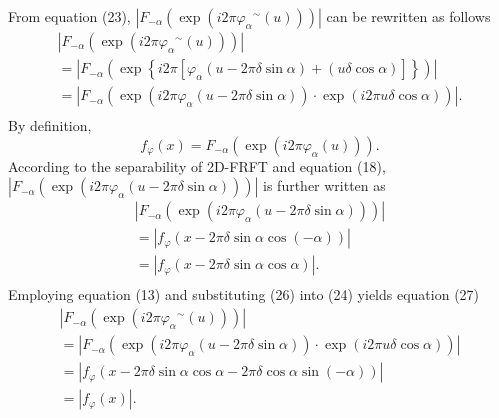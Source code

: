 \documentclass[journal]{IEEEtran}
\begin{document}
From equation (23), $|{{F_{ - \alpha }}(\exp (i2\pi {\varphi _\alpha }^\sim(u)))}|$ can be rewritten as follows
\begin{equation}
\begin{array}{l}
 \left| {{F_{ - \alpha }}(\exp (i2\pi {\varphi _\alpha }^\sim(u)))} \right| \\
  = \left| {{F_{ - \alpha }}(\exp \left\{ {i2\pi [{\varphi _\alpha }(u - 2\pi \delta \sin \alpha ) + (u\delta \cos \alpha )]} \right\})} \right| \\
  = \left| {{F_{ - \alpha }}(\exp (i2\pi {\varphi _\alpha }(u - 2\pi \delta \sin \alpha )) \cdot \exp (i2\pi u\delta \cos \alpha ))} \right|. \\
 \end{array}
\end{equation}
By definition,
\begin{equation}
{f_\varphi }(x) = {F_{ - \alpha }}(\exp (i2\pi {\varphi _\alpha }(u))).
\end{equation}
According to the separability of 2D-FRFT and equation (18), $| {{F_{ - \alpha }}(\exp (i2\pi {\varphi _\alpha }(u - 2\pi \delta \sin \alpha )))} | $ is further written as
\begin{equation}
\begin{array}{l}
 \left| {{F_{ - \alpha }}(\exp (i2\pi {\varphi _\alpha }(u - 2\pi \delta \sin \alpha )))} \right| \\
  = \left| {{f_\varphi }(x - 2\pi \delta \sin \alpha \cos ( - \alpha ))} \right| \\
  = \left| {{f_\varphi }(x - 2\pi \delta \sin \alpha \cos \alpha )} \right|. \\
 \end{array}
\end{equation}
Employing equation (13) and substituting (26) into (24) yields equation (27)
\begin{equation}
\begin{array}{l}
 \left| {{F_{ - \alpha }}(\exp (i2\pi {\varphi _\alpha }^\sim(u)))} \right| \\
  = \left| {{F_{ - \alpha }}(\exp (i2\pi {\varphi _\alpha }(u - 2\pi \delta \sin \alpha )) \cdot \exp (i2\pi u\delta \cos \alpha ))} \right| \\
  = \left| {{f_\varphi }(x - 2\pi \delta \sin \alpha \cos \alpha  - 2\pi \delta \cos \alpha \sin ( - \alpha ))} \right| \\
  = \left| {{f_\varphi }(x)} \right|. \\
 \end{array}
\end{equation}
\end{document}
